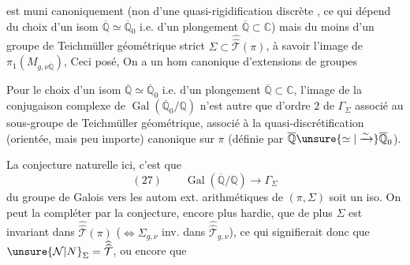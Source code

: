 
est muni canoniquement (non d'une quasi-rigidification discrète , ce qui dépend du choix d'un isom $\overline{\mathbb Q}\simeq\overline{\mathbb Q}_0$ i.e. d'un plongement $\overline{\mathbb Q}\subset\mathbb C$) mais du moins d'un groupe de Teichmüller géométrique strict $\Sigma\subset\widehat{\widehat{\mathcal T}}(\pi)$, à savoir l'image de $\pi_1(M_{g,\nu\overline{\mathbb Q}})$,  Ceci posé, On a un hom canonique d'extensions de groupes


Pour le choix d'un isom $\overline{\mathbb Q}\simeq\overline{\mathbb Q}_0$ i.e. d'un plongement $\overline{\mathbb Q}\subset\mathbb C$, l'image de la conjugaison complexe de $\operatorname{Gal}(\overline{\mathbb Q}_0/\mathbb Q)$ n'est autre que  d'ordre $2$ de $\Gamma_\Sigma$ associé au sous-groupe de Teichmüller géométrique, associé à la quasi-discrétification (orientée, mais peu importe) canonique sur $\pi$ (définie par $\overline{\mathbb Q}\unsure{\simeq|\xrightarrow{\sim}}\overline{\mathbb Q}_0$).


La conjecture naturelle ici, c'est que
\[
(27)\qquad \operatorname{Gal}(\overline{\mathbb Q}/\mathbb Q)\longrightarrow\Gamma_\Sigma
\]
du groupe de Galois vers les autom ext. arithmétiques de $(\pi,\Sigma)$ soit un iso. On peut la compléter par la conjecture, encore plus hardie, que de plus $\Sigma$ est invariant dans $\widehat{\widehat{\mathcal T}}(\pi)$ ($\Longleftrightarrow\Sigma_{g,\nu}$ inv. dans $\widehat{\widehat{\mathcal T}}_{g,\nu}$), ce qui signifierait donc que $\unsure{\mathcal N|N}_\Sigma=\widehat{\widehat{\mathcal T}}$, ou encore que 


